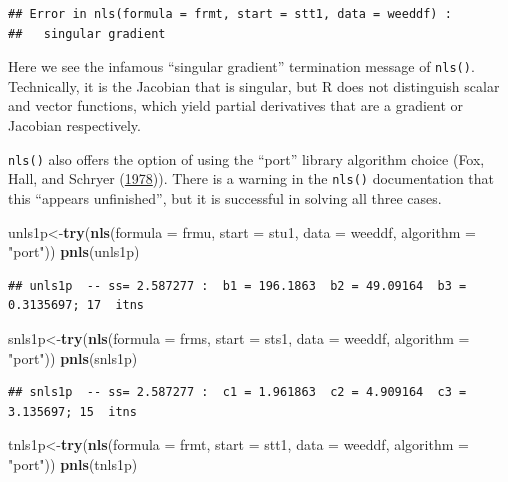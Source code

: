 \documentclass[
]{article}
\newenvironment{Shaded}{\begin{snugshade}}{\end{snugshade}}
\newcommand{\AttributeTok}[1]{\textcolor[rgb]{0.13,0.29,0.53}{#1}}
\newcommand{\FunctionTok}[1]{\textcolor[rgb]{0.13,0.29,0.53}{\textbf{#1}}}
\newcommand{\NormalTok}[1]{#1}
\newcommand{\OtherTok}[1]{\textcolor[rgb]{0.56,0.35,0.01}{#1}}
\newcommand{\StringTok}[1]{\textcolor[rgb]{0.31,0.60,0.02}{#1}}
\begin{document}
\begin{verbatim}
## Error in nls(formula = frmt, start = stt1, data = weeddf) : 
##   singular gradient
\end{verbatim}

Here we see the infamous ``singular gradient'' termination message of
\texttt{nls()}. Technically, it is the Jacobian that is singular, but R
does not distinguish scalar and vector functions, which yield partial
derivatives that are a gradient or Jacobian respectively.

\texttt{nls()} also offers the option of using the ``port'' library
algorithm choice (Fox, Hall, and Schryer
(\protect\hyperlink{ref-FoxHallSchryer1978}{1978})). There is a warning
in the \texttt{nls()} documentation that this ``appears unfinished'',
but it is successful in solving all three cases.

\begin{Shaded}
\begin{Highlighting}[]
\NormalTok{unls1p}\OtherTok{\textless{}{-}}\FunctionTok{try}\NormalTok{(}\FunctionTok{nls}\NormalTok{(}\AttributeTok{formula =}\NormalTok{ frmu, }\AttributeTok{start =}\NormalTok{ stu1, }\AttributeTok{data =}\NormalTok{ weeddf, }\AttributeTok{algorithm =} \StringTok{"port"}\NormalTok{))}
\FunctionTok{pnls}\NormalTok{(unls1p)}
\end{Highlighting}
\end{Shaded}

\begin{verbatim}
## unls1p  -- ss= 2.587277 :  b1 = 196.1863  b2 = 49.09164  b3 = 0.3135697; 17  itns
\end{verbatim}

\begin{Shaded}
\begin{Highlighting}[]
\NormalTok{snls1p}\OtherTok{\textless{}{-}}\FunctionTok{try}\NormalTok{(}\FunctionTok{nls}\NormalTok{(}\AttributeTok{formula =}\NormalTok{ frms, }\AttributeTok{start =}\NormalTok{ sts1, }\AttributeTok{data =}\NormalTok{ weeddf, }\AttributeTok{algorithm =} \StringTok{"port"}\NormalTok{))}
\FunctionTok{pnls}\NormalTok{(snls1p)}
\end{Highlighting}
\end{Shaded}

\begin{verbatim}
## snls1p  -- ss= 2.587277 :  c1 = 1.961863  c2 = 4.909164  c3 = 3.135697; 15  itns
\end{verbatim}

\begin{Shaded}
\begin{Highlighting}[]
\NormalTok{tnls1p}\OtherTok{\textless{}{-}}\FunctionTok{try}\NormalTok{(}\FunctionTok{nls}\NormalTok{(}\AttributeTok{formula =}\NormalTok{ frmt, }\AttributeTok{start =}\NormalTok{ stt1, }\AttributeTok{data =}\NormalTok{ weeddf, }\AttributeTok{algorithm =} \StringTok{"port"}\NormalTok{))}
\FunctionTok{pnls}\NormalTok{(tnls1p)}
\end{Highlighting}
\end{Shaded}
\end{document}
